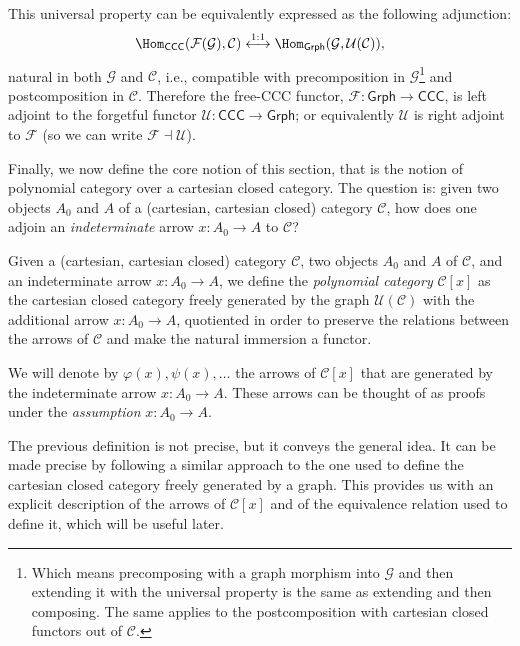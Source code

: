 \begin{remark}
    This universal property can be equivalently expressed as the following adjunction:
    \[ \Hom_{\mathsf{CCC}}(\mathcal F(\mathcal G), \mathcal C) \overset{1:1}{\longleftrightarrow} \Hom_{\mathsf{Grph}}(\mathcal G, \mathcal U(\mathcal C)), \]
    natural in both $\mathcal G$ and $\mathcal C$, i.e., compatible with precomposition in $\mathcal G$\footnote{Which means precomposing with a graph morphism into $\mathcal G$ and then extending it with the universal property is the same as extending and then composing. The same applies to the postcomposition with cartesian closed functors out of $\mathcal C$.} and postcomposition in $\mathcal C$.
    Therefore the free-CCC functor, $\mathcal F : \mathsf{Grph} \to \mathsf{CCC}$, is left adjoint to the forgetful functor $\mathcal U : \mathsf{CCC} \to \mathsf{Grph}$; or equivalently $\mathcal U$ is right adjoint to $\mathcal F$ (so we can write $\mathcal F \dashv \mathcal U$).
\end{remark}

Finally, we now define the core notion of this section, that is the notion of polynomial category over a cartesian closed category. The question is:
given two objects $A_0$ and $A$ of a (cartesian, cartesian closed) category $\mathcal C$, how does one adjoin an \textit{indeterminate} arrow $x : A_0 \to A$ to $\mathcal C$?

\begin{definition}
    Given a (cartesian, cartesian closed) category $\mathcal C$, two objects $A_0$ and $A$ of $\mathcal C$, and an indeterminate arrow $x : A_0 \to A$, we define the \textit{polynomial category} $\mathcal C[x]$ 
    as the cartesian closed category freely generated by the graph $\mathcal U(\mathcal C)$ with the additional arrow $x : A_0 \to A$, quotiented in order to preserve the relations between the arrows of $\mathcal C$ and make the natural immersion a functor.
\end{definition}

\begin{notation}
    We will denote by $\varphi(x), \psi(x), \ldots$ the arrows of $\mathcal C[x]$ that are generated by the indeterminate arrow $x : A_0 \to A$. These arrows 
    can be thought of as proofs under the \textit{assumption} $x : A_0 \to A$.
\end{notation}

The previous definition is not precise, but it conveys the general idea. It can be made precise by following a similar approach to the one used to define the cartesian closed category freely generated by a graph.
This provides us with an explicit description of the arrows of $\mathcal C[x]$ and of the equivalence relation used to define it, which will be useful later.

